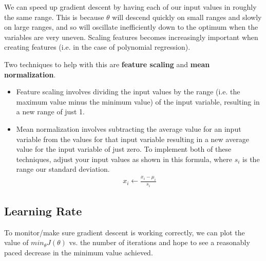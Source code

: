 \documentclass{article}
\begin{document}
        We can speed up gradient descent by having each of our input values in roughly the same range. This is because 
        $\theta$ will descend quickly on small ranges and slowly on large ranges, and so will oscillate inefficiently
        down to the optimum when the variables are very uneven. Scaling features becomes increasingly important when 
        creating features (i.e. in the case of polynomial regression).
        \par
        Two techniques to help with this are \textbf{feature scaling} and \textbf{mean normalization}. 
        \begin{itemize}
            \item Feature scaling involves dividing the input values by the range (i.e. the maximum value minus the minimum value) of the input variable, 
                  resulting in a new range of just 1. 
            \item Mean normalization involves subtracting the average value for an input variable from the values for 
                  that input variable resulting in a new average value for the input variable 
                  of just zero. To implement both of these techniques, adjust your input values as shown in this formula, where $s_i$ is the range our
                  standard deviation.
            \begin{align*}
                x_i \longleftarrow \frac{x_i-\mu_i}{s_i}
            \end{align*}
        \end{itemize}

        \subsection{Learning Rate}

            To monitor/make sure gradient descent is working correctly, we can plot the value of $min_{\theta}J(\theta)$ vs. 
            the number of iterations and hope to see a reasonably paced decrease in the minimum value achieved.
            \begin{center}
            \end{center}
        
\end{document}
